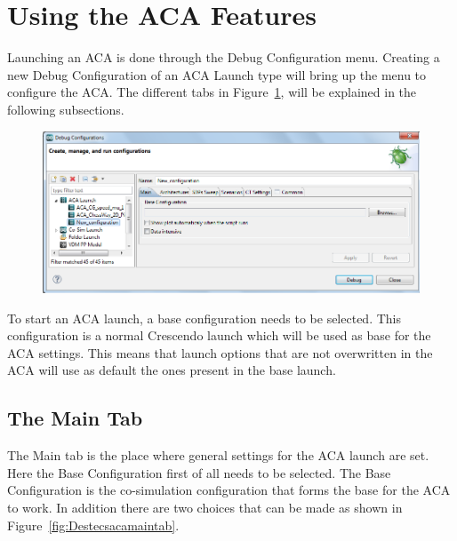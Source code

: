 \documentclass{crescendorepchap}
\begin{document}
\section{Using the ACA Features}

Launching an ACA is done through the Debug Configuration menu.
Creating a new Debug Configuration of an ACA Launch type will bring up
the menu to configure the ACA. The different tabs in Figure~\ref{fig:acadebugconfig}, will be explained in the following subsections.


\begin{figure}[htbp]
\centering
\includegraphics[width=.6\textwidth]{images/DestecsACAdebugconfig.PNG}
\caption{}
\label{fig:acadebugconfig}
\end{figure}

To start an ACA launch, a base configuration needs to be selected. This
configuration is a normal Crescendo launch which will be used as base for
the ACA settings. This means that launch options that are not
overwritten in the ACA will use as default the ones present in the base
launch.

\subsection{The Main Tab}

The Main tab is the place where general settings for the ACA launch
are set. Here the Base Configuration first of all needs to be selected.
The Base Configuration is the co-simulation configuration that
forms the base for the ACA to work. In addition there are two choices that can
be made as shown in Figure~\ref{fig:Destecsacamaintab}. 
\end{document}
